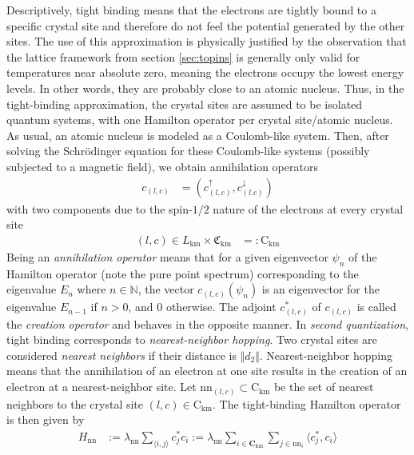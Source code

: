 Descriptively, tight binding means that the electrons are tightly bound to a specific crystal site and therefore do not feel the potential generated by the other sites.
The use of this approximation is physically justified by the observation that the lattice framework from section \ref{sec:topins} is generally only valid for temperatures near absolute zero, meaning the electrons occupy the lowest energy levels.
In other words, they are probably close to an atomic nucleus.
Thus, in the tight-binding approximation, the crystal sites are assumed to be isolated quantum systems, with one Hamilton operator per crystal site/atomic nucleus.
As usual, an atomic nucleus is modeled as a Coulomb-like system.
Then, after solving the Schrödinger equation for these Coulomb-like systems (possibly subjected to a magnetic field), we obtain annihilation operators
\begin{align*}
  c_{(l,c)}
  &=
  (c_{(l,c)}^{\uparrow},c_{(l.c)}^{\downarrow})
\end{align*}
with two components due to the spin-$1/2$ nature of the electrons at every crystal site \begin{align*}
  (l,c)
  \in
  L_{\textrm{km}}
  \times
  \mathfrak{C}_{\textrm{km}}
  &=:
  \mathrm{C}_{\textrm{km}}
\end{align*}
Being an \textit{annihilation operator} means that for a given eigenvector $\psi_{n}$ of the Hamilton operator (note the pure point spectrum) corresponding to the eigenvalue $E_{n}$ where $n \in \mathbb{N}$, the vector $c_{(l,c)}(\psi_{n})$ is an eigenvector for the eigenvalue $E_{n-1}$ if $n > 0$, and $0$ otherwise.
The adjoint $c_{(l,c)}^{\ast}$ of $c_{(l,c)}$ is called the \textit{creation operator} and behaves in the opposite manner.
In \textit{second quantization}, tight binding corresponds to \textit{nearest-neighbor hopping}.
Two crystal sites are considered \textit{nearest neighbors} if their distance is $\Vert d_{2} \Vert$.
Nearest-neighbor hopping means that the annihilation of an electron at one site results in the creation of an electron at a nearest-neighbor site.
Let $\textrm{nn}_{(l,c)} \subset \mathrm{C}_{\textrm{km}}$ be the set of nearest neighbors to the crystal site $(l,c) \in \mathrm{C}_{\textrm{km}}$.
The tight-binding Hamilton operator is then given by
\begin{align*}
  H_{\textrm{nn}}
  &:=
  \lambda_{\textrm{nn}}
  \sum_{\langle i,j \rangle}
  c_{j}^{\ast}
  c_{i}
  :=
  \lambda_{\textrm{nn}}
  \sum_{i \in \mathbf{C}_{\textrm{km}}}
  \sum_{j \in \textrm{nn}_{i}}
  \langle
    c_{j}^{\ast},c_{i}
  \rangle
\end{align*}
